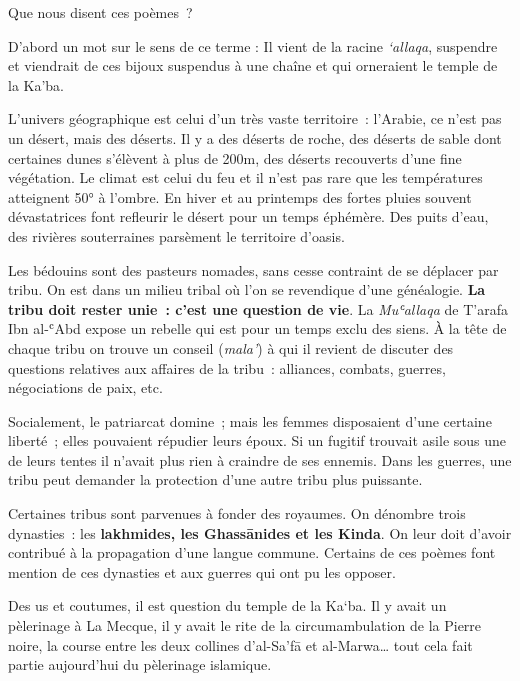 
Que nous disent ces poèmes~?

D'abord un mot sur le sens de ce terme : Il vient de la racine
\emph{`allaqa}, suspendre et viendrait de ces bijoux suspendus à une
chaîne et qui orneraient le temple de la Ka'ba.

L'univers géographique est celui d'un très vaste territoire~: l'Arabie,
ce n'est pas un désert, mais des déserts. Il y a des déserts de roche,
des déserts de sable dont certaines dunes s'élèvent à plus de 200m, des
déserts recouverts d'une fine végétation. Le climat est celui du feu et
il n'est pas rare que les températures atteignent 50° à l'ombre. En
hiver et au printemps des fortes pluies souvent dévastatrices font
refleurir le désert pour un temps éphémère. Des puits d'eau, des
rivières souterraines parsèment le territoire d'oasis.

Les bédouins sont des pasteurs nomades, sans cesse contraint de se
déplacer par tribu. On est dans un milieu tribal où l'on se revendique
d'une généalogie. \textbf{La tribu doit rester unie~: c'est une question
de vie}. La \emph{Muʿallaqa} de T'arafa Ibn al-ʿAbd expose un rebelle
qui est pour un temps exclu des siens. À la tête de chaque tribu on
trouve un conseil (\emph{mala'}) à qui il revient de discuter des
questions relatives aux affaires de la tribu~: alliances, combats,
guerres, négociations de paix, etc.

Socialement, le patriarcat domine~; mais les femmes disposaient d'une
certaine liberté~; elles pouvaient répudier leurs époux. Si un fugitif
trouvait asile sous une de leurs tentes il n'avait plus rien à craindre
de ses ennemis. Dans les guerres, une tribu peut demander la protection
d'une autre tribu plus puissante.

Certaines tribus sont parvenues à fonder des royaumes. On dénombre trois
dynasties~: les \textbf{lakhmides, les Ghassānides et les Kinda}. On
leur doit d'avoir contribué à la propagation d'une langue commune.
Certains de ces poèmes font mention de ces dynasties et aux guerres qui
ont pu les opposer.

Des us et coutumes, il est question du temple de la Ka`ba. Il y avait un
pèlerinage à La Mecque, il y avait le rite de la circumambulation de la
Pierre noire, la course entre les deux collines d'al-Sa'fā et
al-Marwa\ldots{} tout cela fait partie aujourd'hui du pèlerinage
islamique.


